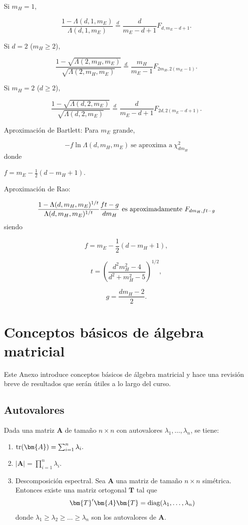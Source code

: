 \documentclass[
  a4paper,
  oneside]{scrbook}
\theoremstyle{definition}
\theoremstyle{definition}
\theoremstyle{definition}
\theoremstyle{definition}
\theoremstyle{remark}
\begin{document}
Si \(m_H=1\),

\[\frac{1-\Lambda(d,1,m_E)}{\Lambda(d,1,m_E)}\stackrel{d}{=} \frac{d}{m_E-d+1} F_{d,m_E-d+1}.\]

Si \(d=2\) (\(m_H\geq 2\)),

\[\frac{1-\sqrt{\Lambda(2,m_H,m_E)}}{\sqrt{\Lambda(2,m_H,m_E)}}\stackrel{d}{=} \frac{m_H}{m_E-1} F_{2m_H,2(m_E-1)}.\]

Si \(m_H=2\) (\(d\geq 2\)),

\[\frac{1-\sqrt{\Lambda(d,2,m_E)}}{\sqrt{\Lambda(d,2,m_E)}}\stackrel{d}{=} \frac{d}{m_E-d+1} F_{2d,2(m_E-d+1)}.\]

Aproximación de Bartlett: Para \(m_E\) grande,

\[-f\ln \Lambda(d,m_H,m_E)\ \mbox{se aproxima a}\ \chi_{dm_H}^2\] donde

\(f=m_E-\frac{1}{2}(d-m_H+1).\)

Aproximación de Rao:

\[\frac{1-\Lambda(d,m_H,m_E)^{1/t}}{\Lambda(d,m_H,m_E)^{1/t}}\frac{ft-g}{dm_H}\textnormal{ es aproximadamente } F_{dm_H,ft-g}\]
siendo

\[f=m_E-\frac{1}{2}(d-m_H+1),\]

\[t=\left(\frac{d^2m_H^2-4}{d^2+m_H^2-5}\right)^{1/2},\]

\[g=\frac{dm_H-2}{2}.\]

\chapter{Conceptos básicos de álgebra matricial}\label{anexoAlg}

Este Anexo introduce conceptos básicos de álgebra matricial y hace una
revisión breve de resultados que serán útiles a lo largo del curso.

\section{Autovalores}\label{autovalores}

Dada una matriz \(\bm{A}\) de tamaño \(n\times n\) con autovalores
\(\lambda_1,\ldots,\lambda_n\), se tiene:

\begin{enumerate}
\def\labelenumi{\arabic{enumi}.}
\item
  \(\textnormal{tr}(\bm{A})=\sum_{i=1}^n\lambda_i.\)
\item
  \(\left|\bm{A}\right|=\prod_{i=1}^n\lambda_i.\)
\item
  Descomposición espectral. Sea \(\bm{A}\) una matriz de tamaño
  \(n\times n\) simétrica. Entonces existe una matriz ortogonal \(\bm{T}\)
  tal que
  \[\bm{T}^\prime{}\bm{A}\bm{T}=\textnormal{diag}(\lambda_1,\ldots,\lambda_n)\]
  donde \(\lambda_1\geq \lambda_2\geq\ldots\geq\lambda_n\) son los
  autovalores de \(\bm{A}\).
\end{enumerate}
\end{document}
